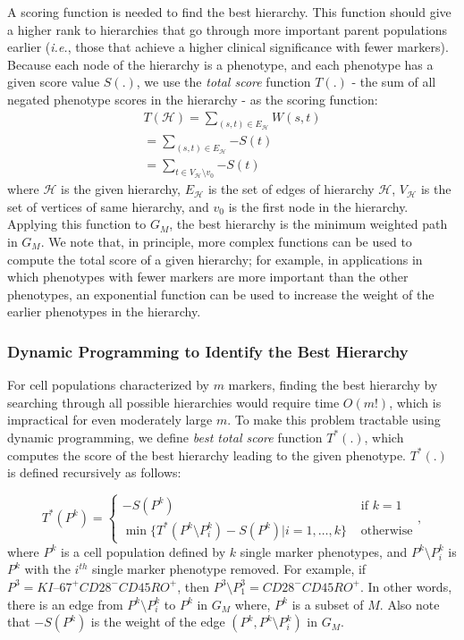 A scoring function is needed to find the best hierarchy.  This function should give a higher rank to hierarchies that
go through more important parent populations earlier (\emph{i.e.}, those that achieve a higher clinical significance with fewer
markers).  
Because each node of the hierarchy is a phenotype, and each phenotype has a given score value $S(.)$, we
use the \emph{total score} function $T(.)$ - the sum of all negated phenotype scores in the hierarchy - as the scoring
function:
\begin{equation}
\begin{split}
	T(\mathcal{H}) = \sum_{(s, t) \in E_{\mathcal{H}}}{W(s, t)} \\
	= \sum_{(s, t) \in E_{\mathcal{H}}}{-S(t)} \\
	= \sum_{t \in V_{\mathcal{H}} \setminus v_0}{-S(t)}
\end{split}
\end{equation}
where $\mathcal{H}$ is the given hierarchy, $E_{\mathcal{H}}$ is the set of edges of hierarchy $\mathcal{H}$, $V_{\mathcal{H}}$ is the
set of vertices of same hierarchy, and $v_0$ is the first node in the hierarchy.
Applying this function to $G_M$, the best hierarchy is the minimum weighted path in $G_M$. 
We note that, in principle, more complex functions can be used to compute the total score of a given hierarchy; for
example, in applications in which phenotypes with fewer markers are more important than the other phenotypes, an exponential 
function can be used to increase the weight of the earlier phenotypes in the hierarchy.


\subsubsection{Dynamic Programming to Identify the Best Hierarchy}
For cell populations characterized by $m$ markers, finding the best hierarchy 
by searching through all possible hierarchies would require time $O(m!)$, which is impractical for even moderately large $m$. 
To make this problem tractable using dynamic programming, we define \emph{best total score} function $T^*(.)$, which computes
the score of the best hierarchy leading to the given phenotype. $T^*(.)$ is defined recursively as follows: 

\begin{equation}
  T^*(P^k) = \left\{ \begin{array}{cl}
      -S(P^k) &\mbox{ if $k = 1$} \\
      \min\{T^*(P^k \setminus P^{k}_{i}) - S(P^k)|i=1,\dots,k\} &\mbox{ otherwise}
    \end{array} \right.,
  \label{totalscore}
\end{equation} 
where $P^k$ is a cell population defined by  $k$  single marker phenotypes, and $P^k \setminus P^k_{i}$ is $P^k$
with the $i^{th}$ single marker phenotype removed.  For example, if $P^3=KI\mbox{--}67^+CD28^-CD45RO^+$, then
$P^3\setminus P^3_1=CD28^-CD45RO^+$.  In other words, there is an edge from $P^k \setminus P^k_{i}$ to $P^k$ in $G_M$
where, $P^k$ is a subset of $M$. Also note that $-S(P^k)$ is the weight of the edge $(P^k, P^k \setminus P^k_{i})$ in
$G_M$.


